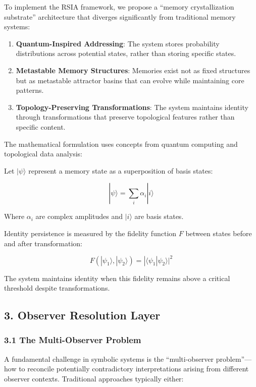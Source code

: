 \documentclass[12pt]{article}
\begin{document}
To implement the RSIA framework, we propose a ``memory crystallization
substrate'' architecture that diverges significantly from traditional
memory systems:

\begin{enumerate}
\def\labelenumi{\arabic{enumi}.}
\item
  \textbf{Quantum-Inspired Addressing}: The system stores probability distributions across potential
  states, rather than storing specific states.
\item
  \textbf{Metastable Memory Structures}: Memories exist not as fixed
  structures but as metastable attractor basins that can evolve while
  maintaining core patterns.
\item
  \textbf{Topology-Preserving Transformations}: The system maintains
  identity through transformations that preserve topological features
  rather than specific content.
\end{enumerate}

The mathematical formulation uses concepts from quantum computing and
topological data analysis:

Let \(|\psi\rangle\) represent a memory state as a superposition of
basis states:

\[|\psi\rangle = \sum_i \alpha_i |i\rangle\]

Where \(\alpha_i\) are complex amplitudes and \(|i\rangle\) are basis
states.

Identity persistence is measured by the fidelity function \(F\) between
states before and after transformation:

\[F(|\psi_1\rangle, |\psi_2\rangle) = |\langle\psi_1|\psi_2\rangle|^2\]

The system maintains identity when this fidelity remains above a
critical threshold despite transformations.

\subsection{3. Observer Resolution
Layer}\label{observer-resolution-layer}

\subsubsection{3.1 The Multi-Observer
Problem}\label{the-multi-observer-problem}

A fundamental challenge in symbolic systems is the ``multi-observer
problem''---how to reconcile potentially contradictory interpretations
arising from different observer contexts. Traditional approaches
typically either:
\end{document}
